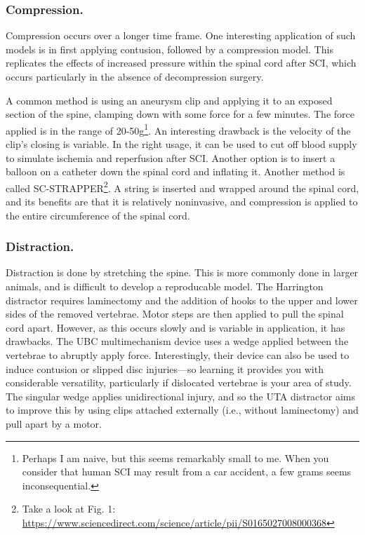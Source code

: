 \subsubsection{Compression.}
Compression occurs over a longer time frame. One interesting application of such models is in first applying contusion, followed by a compression model. This replicates the effects of increased pressure within the spinal cord after SCI, which occurs particularly in the absence of decompression surgery.\newline

A common method is using an aneurysm clip and applying it to an exposed section of the spine, clamping down with some force for a few minutes. The force applied is in the range of 20-50g\footnote{Perhaps I am naive, but this seems remarkably small to me. When you consider that human SCI may result from a car accident, a few grams seems inconsequential.}. An interesting drawback is the velocity of the clip's closing is variable. In the right usage, it can be used to cut off blood supply to simulate ischemia and reperfusion after SCI. Another option is to insert a balloon on a catheter down the spinal cord and inflating it. Another method is called SC-STRAPPER\footnote{Take a look at Fig. 1: \url{https://www.sciencedirect.com/science/article/pii/S0165027008000368} }. A string is inserted and wrapped around the spinal cord, and its benefits are that it is relatively noninvasive, and compression is applied to the entire circumference of the spinal cord. 

\subsubsection{Distraction.}
Distraction is done by stretching the spine. This is more commonly done in larger animals, and is difficult to develop a reproducable model. The Harrington distractor requires laminectomy and the addition of hooks to the upper and lower sides of the removed vertebrae. Motor steps are then applied to pull the spinal cord apart. However, as this occurs slowly and is variable in application, it has drawbacks. The UBC multimechanism device uses a wedge applied between the vertebrae to abruptly apply force. Interestingly, their device can also be used to induce contusion or slipped disc injuries---so learning it provides you with considerable versatility, particularly if dislocated vertebrae is your area of study. The singular wedge applies unidirectional injury, and so the UTA distractor aims to improve this by using clips attached externally (i.e., without laminectomy) and pull apart by a motor. 

